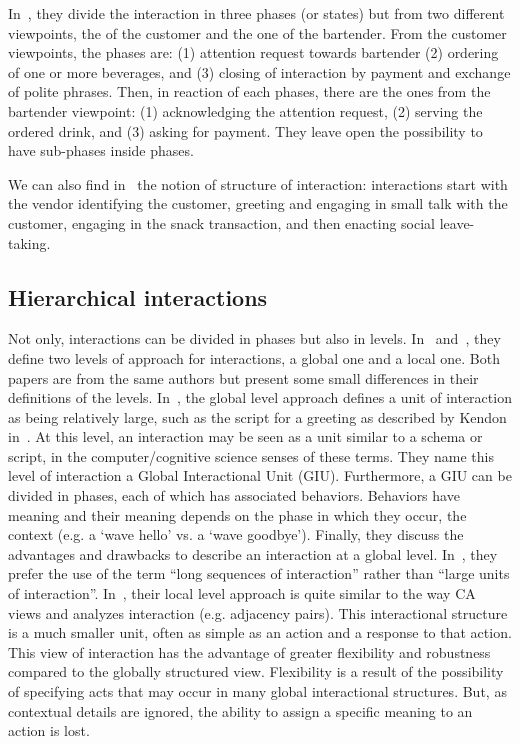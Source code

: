 \documentclass[a4paper,11pt,twoside]{StyleThese}
\begin{document}
In~\cite{gaschler_2012_modelling}, they divide the interaction in three phases (or states) but from two different viewpoints, the of the customer and the one of the bartender. From the customer viewpoints, the phases are: (1) attention request towards bartender (2) ordering of one or more beverages, and (3) closing of interaction by payment and exchange of polite phrases. Then, in reaction of each phases, there are the ones from the bartender viewpoint: (1) acknowledging the attention request, (2) serving the ordered drink, and (3) asking for payment.
They leave open the possibility to have sub-phases inside phases.

We can also find in~\cite{lee_2012_personalization} the notion of structure of interaction: interactions start with the vendor identifying the customer, greeting and engaging in small talk with the customer, engaging in the snack transaction, and then enacting social leave-taking.

\subsection{Hierarchical interactions}
Not only, interactions can be divided in phases but also in levels. In~\cite{dautenhahn_2002_embodied} and~\cite{ogden_2001_interactional}, they define two levels of approach for interactions, a global one and a local one. Both papers are from the same authors but present some small differences in their definitions of the levels.
In~\cite{dautenhahn_2002_embodied}, the global level approach defines a unit of interaction as being relatively large, such as the script for a greeting as described by Kendon in~\cite{kendon_1990_conducting}. At this level, an interaction may be seen as a unit similar to a schema or script, in the computer/cognitive science senses of these terms. They name this level of interaction a Global Interactional Unit (GIU). Furthermore, a GIU can be divided in phases, each of which has associated behaviors. Behaviors have meaning and their meaning depends on the phase in which they occur, the context (e.g. a ‘wave hello’ vs. a ‘wave goodbye’). Finally, they discuss the advantages and drawbacks to describe an interaction at a global level. In~\cite{ogden_2001_interactional}, they prefer the use of the term ``long sequences of interaction'' rather than ``large units of interaction''.
In~\cite{dautenhahn_2002_embodied}, their local level approach is quite similar to the way CA views and analyzes interaction (e.g. adjacency pairs). This interactional structure is a much smaller unit, often as simple as an action and a response to that action. This view of interaction has the advantage of greater flexibility and robustness compared to the globally structured view. Flexibility is a result of the possibility of specifying acts that may occur in many global interactional structures. But, as contextual details are ignored, the ability to assign a specific meaning to an action is lost.
\end{document}
